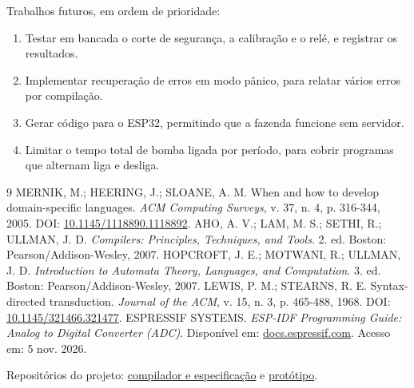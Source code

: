 \documentclass[11pt,a4paper]{article}
\begin{document}
Trabalhos futuros, em ordem de prioridade:

\begin{enumerate}
  \item Testar em bancada o corte de segurança, a calibração e o relé, e registrar os resultados.
  \item Implementar recuperação de erros em modo pânico, para relatar vários erros por compilação.
  \item Gerar código para o ESP32, permitindo que a fazenda funcione sem servidor.
  \item Limitar o tempo total de bomba ligada por período, para cobrir programas que alternam liga e desliga.
\end{enumerate}

\begin{thebibliography}{9}
 MERNIK, M.; HEERING, J.; SLOANE, A. M. When and how to develop domain-specific languages. \textit{ACM Computing Surveys}, v. 37, n. 4, p. 316-344, 2005. DOI: \href{https://doi.org/10.1145/1118890.1118892}{10.1145/1118890.1118892}.
 AHO, A. V.; LAM, M. S.; SETHI, R.; ULLMAN, J. D. \textit{Compilers: Principles, Techniques, and Tools}. 2. ed. Boston: Pearson/Addison-Wesley, 2007.
 HOPCROFT, J. E.; MOTWANI, R.; ULLMAN, J. D. \textit{Introduction to Automata Theory, Languages, and Computation}. 3. ed. Boston: Pearson/Addison-Wesley, 2007.
 LEWIS, P. M.; STEARNS, R. E. Syntax-directed transduction. \textit{Journal of the ACM}, v. 15, n. 3, p. 465-488, 1968. DOI: \href{https://doi.org/10.1145/321466.321477}{10.1145/321466.321477}.
 ESPRESSIF SYSTEMS. \textit{ESP-IDF Programming Guide: Analog to Digital Converter (ADC)}. Disponível em: \href{https://docs.espressif.com/projects/esp-idf/en/v4.4/esp32/api-reference/peripherals/adc.html}{docs.espressif.com}. Acesso em: 5 nov. 2026.
\end{thebibliography}

\noindent Repositórios do projeto: \href{https://github.com/BernardoMGG/compiladores_fazenda}{compilador e especificação} e \href{https://github.com/gl-dias/minec-irrigacao}{protótipo}.
\end{document}

